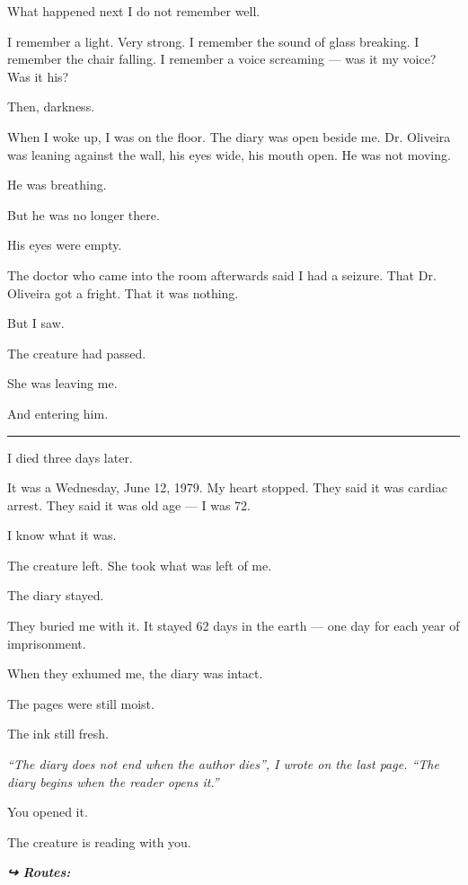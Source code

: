 \noindent What happened next I do not remember well.

\noindent I remember a light. Very strong. I remember the sound of glass breaking. I remember the chair falling. I remember a voice screaming --- was it my voice? Was it his?

\noindent Then, darkness.

\noindent When I woke up, I was on the floor. The diary was open beside me. Dr. Oliveira was leaning against the wall, his eyes wide, his mouth open. He was not moving.

\noindent He was breathing.

\noindent But he was no longer there.

\noindent His eyes were empty.

\noindent The doctor who came into the room afterwards said I had a seizure. That Dr. Oliveira got a fright. That it was nothing.

\noindent But I saw.

\noindent The creature had passed.

\noindent She was leaving me.

\noindent And entering him.

\vspace{0.5em}\noindent\rule{\textwidth}{0.5pt}\vspace{0.5em}

\noindent I died three days later.

\noindent It was a Wednesday, June 12, 1979. My heart stopped. They said it was cardiac arrest. They said it was old age --- I was 72.

\noindent I know what it was.

\noindent The creature left. She took what was left of me.

\noindent The diary stayed.

\noindent They buried me with it. It stayed 62 days in the earth --- one day for each year of imprisonment.

\noindent When they exhumed me, the diary was intact.

\noindent The pages were still moist.

\noindent The ink still fresh.

\noindent \textit{\textquotedblleft{}The diary does not end when the author dies\textquotedblright{}\textit{, I wrote on the last page. }\textquotedblleft{}The diary begins when the reader opens it.\textquotedblright{}}

\noindent You opened it.

\noindent The creature is reading with you.

\vspace{0.5em}
\noindent\textit{\textbf{↪ Routes:}  \rotasep {} \rotasep {}}
